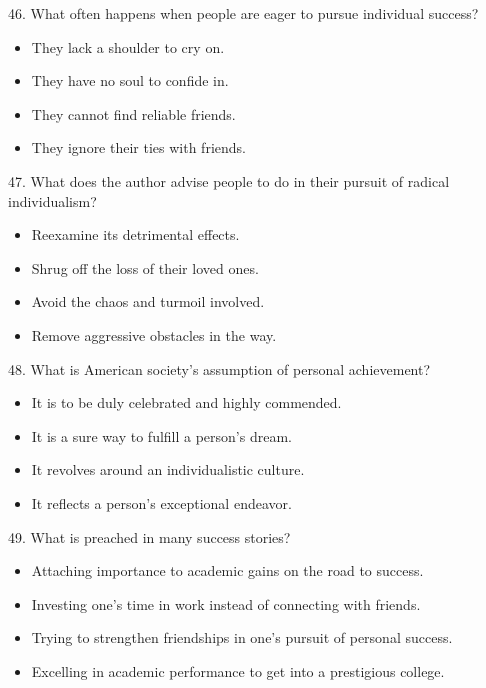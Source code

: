 \documentclass[UTF8,11pt]{ctexart}
\begin{document}
46. What often happens when people are eager to pursue individual success?


\begin{itemize}[leftmargin=2em,itemsep=.2em,topsep=.4em]\item[A.] They lack a shoulder to cry on.
\item[B.] They have no soul to confide in.
\item[C.] They cannot find reliable friends.
\item[D.] They ignore their ties with friends.
\end{itemize}

47. What does the author advise people to do in their pursuit of radical individualism?


\begin{itemize}[leftmargin=2em,itemsep=.2em,topsep=.4em]\item[A.] Reexamine its detrimental effects.
\item[B.] Shrug off the loss of their loved ones.
\item[C.] Avoid the chaos and turmoil involved.
\item[D.] Remove aggressive obstacles in the way.
\end{itemize}

48. What is American society’s assumption of personal achievement?


\begin{itemize}[leftmargin=2em,itemsep=.2em,topsep=.4em]\item[A.] It is to be duly celebrated and highly commended.
\item[B.] It is a sure way to fulfill a person’s dream.
\item[C.] It revolves around an individualistic culture.
\item[D.] It reflects a person’s exceptional endeavor.
\end{itemize}

49. What is preached in many success stories?


\begin{itemize}[leftmargin=2em,itemsep=.2em,topsep=.4em]\item[A.] Attaching importance to academic gains on the road to success.
\item[B.] Investing one’s time in work instead of connecting with friends.
\item[C.] Trying to strengthen friendships in one’s pursuit of personal success.
\item[D.] Excelling in academic performance to get into a prestigious college.
\end{itemize}
\end{document}
